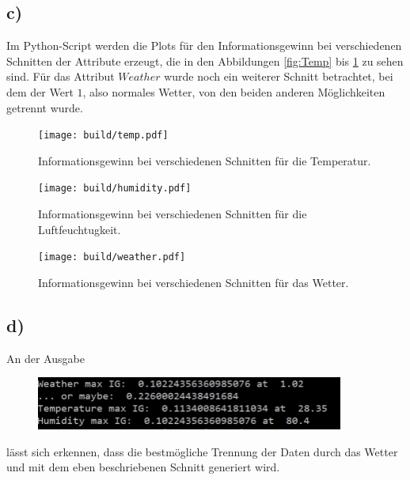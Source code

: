 \subsection*{c)}
Im Python-Script werden die Plots für den Informationsgewinn bei verschiedenen Schnitten der Attribute erzeugt, die in den Abbildungen \ref{fig:Temp} bis \ref{fig:weather} zu sehen sind.
Für das Attribut $Weather$ wurde noch ein weiterer Schnitt betrachtet, bei dem der Wert $1$, also normales Wetter, von den beiden anderen Möglichkeiten getrennt wurde.
\begin{figure}
\begin{minipage}{0.4\textwidth}
\texttt{[image: build/temp.pdf]}
\caption{Informationsgewinn bei verschiedenen Schnitten für die Temperatur.}\label{fig:temp}
\texttt{[image: build/humidity.pdf]}
\caption{Informationsgewinn bei verschiedenen Schnitten für die Luftfeuchtugkeit.}\label{fig:hum}
\end{minipage}
\begin{minipage}{0.4\textwidth}
\texttt{[image: build/weather.pdf]}
\caption{Informationsgewinn bei verschiedenen Schnitten für das Wetter.}\label{fig:weather}
\end{minipage}
\end{figure}

\subsection*{d)}
\noindent An der Ausgabe
\begin{figure}
\centering
\includegraphics[width = 0.9\textwidth]{content/tables/out.pdf}
\end{figure}
\noindent lässt sich erkennen, dass die bestmögliche Trennung der Daten durch das Wetter und mit dem eben beschriebenen Schnitt generiert wird.

